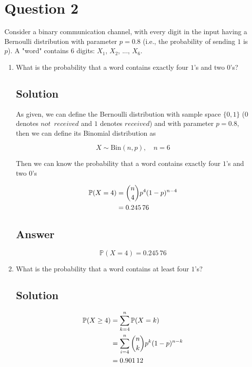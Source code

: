 \documentclass[12pt]{article}
\newcommand{\bP}{\mathbb{P}}
\begin{document}
	
	\section*{Question 2}
	
	\noindent Consider a binary communication channel, with every digit in the input having a Bernoulli distribution with parameter $p = 0.8$ (i.e., the probability of sending $1$ is $p$). A "word" contains 6 digits: $X_1$, $X_2$, ..., $X_6$.
	
	\bigskip
	
	\begin{enumerate}[start=1,label={\bfseries Part \arabic*:},leftmargin=0in]
		\bigskip\item What is the probability that a word contains exactly four $1$'s and two $0$'s?
		
		\subsection*{Solution}
		
			As given, we can define the Bernoulli distribution with sample space $\{0,1\}$ ($0$ denotes $not\enspace received$ and $1$ denotes $received$) and with parameter $p = 0.8$, then we can define its Binomial distribution as
			
			\[X\sim \text{Bin}(n,p),\quad n = 6\]
			
			Then we can know the probability that a word contains exactly four $1$'s and two $0$'s
			
			\[
			\begin{aligned}
				\bP(X = 4) &= \dbinom{n}{4}p^4(1-p)^{n-4}\\
				&= 0.245\,76
			\end{aligned}
			\]
		
		\subsection*{Answer}
		
			\[\boxed{\bP(X = 4) = 0.245\,76}\]
		
		\bigskip\item What is the probability that a word contains at least four $1$'s?
		
		\subsection*{Solution}
		
			\[
			\begin{aligned}
				\bP(X\ge 4) &= \sum_{k = 4}^n\bP(X = k)\\
				&= \sum_{i = 4}^n\dbinom{n}{k}p^k(1-p)^{n-k}\\
				&= 0.901\,12
			\end{aligned}
			\]
		

\end{enumerate}
\end{document}
